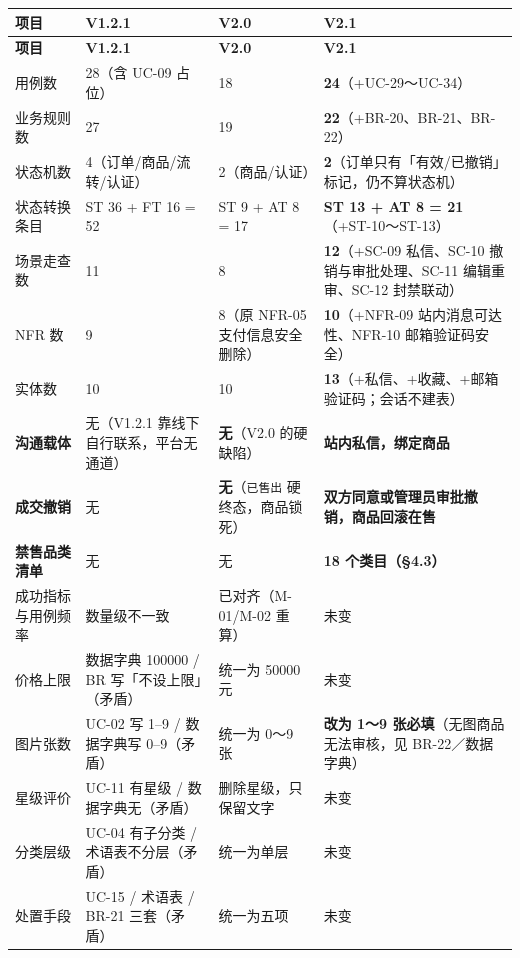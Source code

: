 \documentclass[12pt,a4paper]{ctexart}
\begin{document}
{\scriptsize
\begin{longtable}{|p{2.71cm}|p{4.12cm}|p{3.26cm}|p{5.91cm}|}
\hline
\textbf{项目} & \textbf{V1.2.1} & \textbf{V2.0} & \textbf{\textbf{V2.1}} \\
\hline
\endfirsthead
\hline
\textbf{项目} & \textbf{V1.2.1} & \textbf{V2.0} & \textbf{\textbf{V2.1}} \\
\hline
\endhead
\hline
\endfoot
用例数 & 28（含 UC-09 占位） & 18 & \textbf{24}（+UC-29～UC-34） \\
\hline
业务规则数 & 27 & 19 & \textbf{22}（+BR-20、BR-21、BR-22） \\
\hline
状态机数 & 4（订单/商品/流转/认证） & 2（商品/认证） & \textbf{2}（订单只有「有效/已撤销」标记，仍不算状态机） \\
\hline
状态转换条目 & ST 36 + FT 16 = 52 & ST 9 + AT 8 = 17 & \textbf{ST 13 + AT 8 = 21}（+ST-10～ST-13） \\
\hline
场景走查数 & 11 & 8 & \textbf{12}（+SC-09 私信、SC-10 撤销与审批处理、SC-11 编辑重审、SC-12 封禁联动） \\
\hline
NFR 数 & 9 & 8（原 NFR-05 支付信息安全删除） & \textbf{10}（+NFR-09 站内消息可达性、NFR-10 邮箱验证码安全） \\
\hline
实体数 & 10 & 10 & \textbf{13}（+私信、+收藏、+邮箱验证码；会话不建表） \\
\hline
\textbf{沟通载体} & 无（V1.2.1 靠线下自行联系，平台无通道） & \textbf{无}（V2.0 的硬缺陷） & \textbf{站内私信，绑定商品} \\
\hline
\textbf{成交撤销} & 无 & \textbf{无}（\texttt{已售出} 硬终态，商品锁死） & \textbf{双方同意或管理员审批撤销，商品回滚在售} \\
\hline
\textbf{禁售品类清单} & 无 & 无 & \textbf{18 个类目（§4.3）} \\
\hline
成功指标与用例频率 & 数量级不一致 & 已对齐（M-01/M-02 重算） & 未变 \\
\hline
价格上限 & 数据字典 100000 / BR 写「不设上限」（矛盾） & 统一为 50000 元 & 未变 \\
\hline
图片张数 & UC-02 写 1–9 / 数据字典写 0–9（矛盾） & 统一为 0～9 张 & \textbf{改为 1～9 张必填}（无图商品无法审核，见 BR-22／数据字典） \\
\hline
星级评价 & UC-11 有星级 / 数据字典无（矛盾） & 删除星级，只保留文字 & 未变 \\
\hline
分类层级 & UC-04 有子分类 / 术语表不分层（矛盾） & 统一为单层 & 未变 \\
\hline
处置手段 & UC-15 / 术语表 / BR-21 三套（矛盾） & 统一为五项 & 未变 \\

\end{longtable}}
\end{document}
